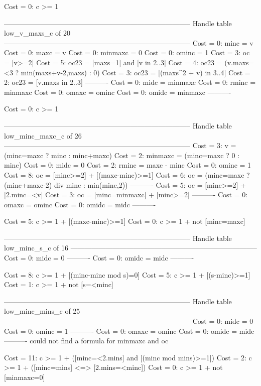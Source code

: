 Cost =  0:  c >= 1

--------------------------------------------------------------------------------
Handle table low_v_maxs_c of 20
--------------------------------------------------------------------------------
Cost =  0:  minc    = v
Cost =  0:  maxc    = v
Cost =  0:  minmaxc = 0
Cost =  0:  ominc   = 1
Cost =  3:  oc      = [v>=2]
Cost =  5:  oc23    = [maxs=1] and [v in 2..3]
Cost =  4:  oc23    = (v.maxs=<3 ? min(maxs+v-2,maxs) : 0)
Cost =  3:  oc23    = [(maxs^2 + v) in 3..4]
Cost =  2:  oc23    = [v.maxs in 2..3]
----------
Cost =  0:  midc    = minmaxc
Cost =  0:  rminc   = minmaxc
Cost =  0:  omaxc   = ominc
Cost =  0:  omidc   = minmaxc
----------

Cost =  0:  c >= 1

--------------------------------------------------------------------------------
Handle table low_minc_maxc_c of 26
--------------------------------------------------------------------------------
Cost =  3:  v       = (minc=maxc ? minc : minc+maxc)
Cost =  2:  minmaxc = (minc=maxc ? 0 : minc)
Cost =  0:  midc    = 0
Cost =  2:  rminc   = maxc - minc
Cost =  0:  ominc   = 1
Cost =  8:  oc      = [minc>=2] + [(maxc-minc)>=1]
Cost =  6:  oc      = (minc=maxc ? (minc+maxc-2) div minc : min(minc,2))
----------
Cost =  5:  oc      = [minc>=2] + [2.minc=<v]
Cost =  3:  oc      = [minc=minmaxc] + [minc>=2]
----------
Cost =  0:  omaxc   = ominc
Cost =  0:  omidc   = midc
----------

Cost =  5:  c >= 1 + [(maxc-minc)>=1]
Cost =  0:  c >= 1 + not [minc=maxc]

--------------------------------------------------------------------------------
Handle table low_minc_s_c of 16
--------------------------------------------------------------------------------
Cost =  0:  midc  = 0
----------
Cost =  0:  omidc = midc
----------

Cost =  8:  c >= 1 + [(minc-minc mod s)=0]
Cost =  5:  c >= 1 + [(s-minc)>=1]
Cost =  1:  c >= 1 + not [s=<minc]

--------------------------------------------------------------------------------
Handle table low_minc_mins_c of 25
--------------------------------------------------------------------------------
Cost =  0:  midc    = 0
Cost =  0:  ominc   = 1
----------
Cost =  0:  omaxc   = ominc
Cost =  0:  omidc   = midc
----------
could not find a formula for minmaxc and oc

Cost = 11:  c >= 1 + ([minc=<2.mins] and [(minc mod mins)>=1])
Cost =  2:  c >= 1 + ([minc=mins] <=> [2.mins=<minc])
Cost =  0:  c >= 1 + not [minmaxc=0]

